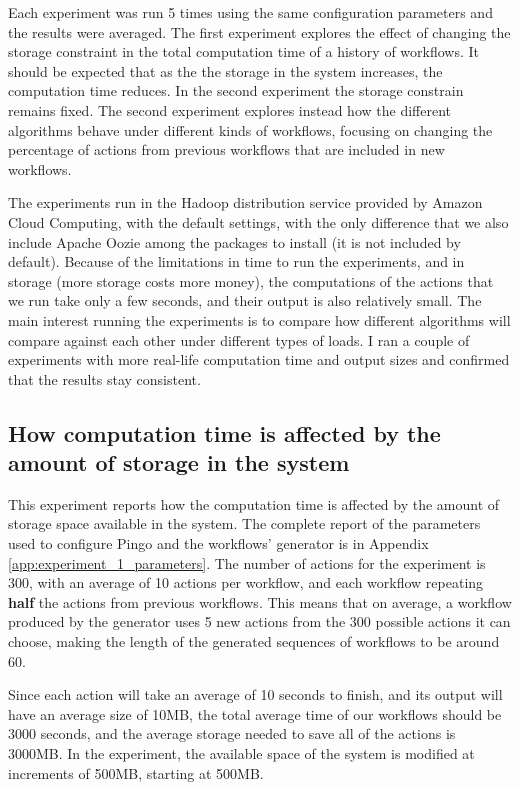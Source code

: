 Each experiment was run 5 times using the same configuration parameters and the results were averaged.  The first experiment explores the effect of changing the storage constraint in the total computation time of a history of workflows.  It should be expected that as the the storage in the system increases, the computation time reduces.  In the second experiment the storage constrain remains fixed.  The second experiment explores instead how the different algorithms behave under different kinds of workflows, focusing on changing the percentage of actions from previous workflows that are included in new workflows.

The experiments run in the Hadoop distribution service provided by Amazon Cloud Computing, with the default settings, with the only difference that we also include Apache Oozie among the packages to install (it is not included by default).  Because of the limitations in time to run the experiments, and in storage (more storage costs more money), the computations of the actions that we run take only a few seconds, and their output is also relatively small.  The main interest running the experiments is to compare how different algorithms will compare against each other under different types of loads.  I ran a couple of experiments with more real-life computation time and output sizes and confirmed that the results stay consistent.

\subsection{How computation time is affected by the amount of storage in the system}
This experiment reports how the computation time is affected by the amount of storage space available in the system. The complete report of the parameters used to configure Pingo and the workflows' generator is in Appendix \ref{app:experiment_1_parameters}.  The number of actions for the experiment is 300, with an average of 10 actions per workflow, and each workflow repeating \textbf{half} the actions from previous workflows.  This means that on average, a workflow produced by the generator uses 5 new actions from the 300 possible actions it can choose, making the length of the generated sequences of workflows to be around 60.

Since each action will take an average of 10 seconds to finish, and its output will have an average size of 10MB, the total average time of our workflows should be 3000 seconds, and the average storage needed to save all of the actions is 3000MB.  In the experiment, the available space of the system is modified at increments of 500MB, starting at 500MB. 

